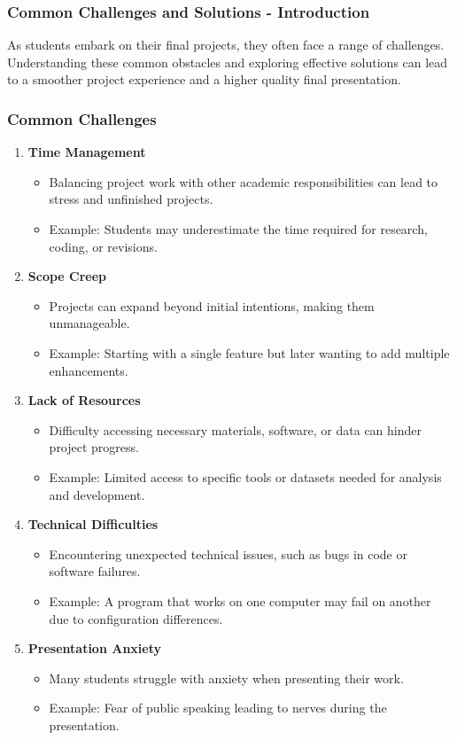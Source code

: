 \documentclass[aspectratio=169]{beamer}
\begin{document}
\begin{frame}[fragile]
  \frametitle{Common Challenges and Solutions - Introduction}
  As students embark on their final projects, they often face a range of challenges. Understanding these common obstacles and exploring effective solutions can lead to a smoother project experience and a higher quality final presentation.
\end{frame}

\begin{frame}[fragile]
  \frametitle{Common Challenges}
  \begin{enumerate}
    \item \textbf{Time Management}
      \begin{itemize}
        \item Balancing project work with other academic responsibilities can lead to stress and unfinished projects.
        \item Example: Students may underestimate the time required for research, coding, or revisions.
      \end{itemize}
    \item \textbf{Scope Creep}
      \begin{itemize}
        \item Projects can expand beyond initial intentions, making them unmanageable.
        \item Example: Starting with a single feature but later wanting to add multiple enhancements.
      \end{itemize}
    \item \textbf{Lack of Resources}
      \begin{itemize}
        \item Difficulty accessing necessary materials, software, or data can hinder project progress.
        \item Example: Limited access to specific tools or datasets needed for analysis and development.
      \end{itemize}
    \item \textbf{Technical Difficulties}
      \begin{itemize}
        \item Encountering unexpected technical issues, such as bugs in code or software failures.
        \item Example: A program that works on one computer may fail on another due to configuration differences.
      \end{itemize}
    \item \textbf{Presentation Anxiety}
      \begin{itemize}
        \item Many students struggle with anxiety when presenting their work.
        \item Example: Fear of public speaking leading to nerves during the presentation.
      \end{itemize}
  \end{enumerate}
\end{frame}
\end{document}
